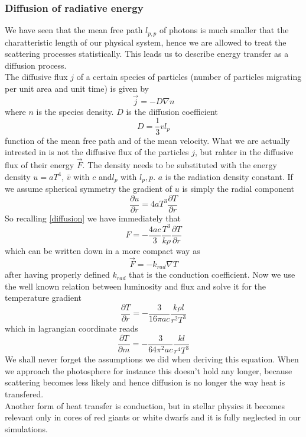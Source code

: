 \documentclass[11pt]{article}
\begin{document}
\subsubsection{Diffusion of radiative energy}
We have seen that the mean free path $l_{p,p}$ of photons is much smaller that the charatteristic length of our physical system, hence we are allowed to treat the scattering processes statistically. This leads us to describe energy transfer as a diffusion process. \\
The diffusive flux $j$ of a certain species of particles (number of particles migrating per unit area and unit time) is given by
\begin{equation}\label{diffusion}
	\vec  j=-D \nabla n
\end{equation}
where $n$ is the species density. $D$ is the diffusion coefficient
\begin{equation}
	D =\frac{1}{3} v l_{p}
\end{equation}
function of the mean free path and of the mean velocity. What we are actually intrested in is not the diffusive flux of the particles $j$, but rahter in the diffusive flux of their energy $\vec F$. The density needs to be substituted with the energy density $u=aT^4$, $\bar v$ with $c$ and$l_p$ with $l_p,p$. $a$ is the radiation density constant. If we assume spherical symmetry the gradient of $u$ is simply the radial component
\begin{equation}
	\frac{\partial u}{\partial r} = 4  a  T^3   \frac{\partial T}{\partial r}
\end{equation}
So recalling \ref{diffusion} we have immediately that
\begin{equation}
	F=-\frac{4ac}{3}\frac{T^3}{k \rho} \frac{\partial T}{\partial r}
\end{equation}
which can be written down in a more compact way as 
\begin{equation}
	\vec F = - k_{rad} \nabla T
\end{equation}
after having properly defined $k_{rad}$ that is the conduction coefficient. Now we use the well known relation between luminosity and flux and solve it for the temperature gradient
\begin{equation}
	\frac{\partial T}{\partial r}= - \frac{3}{16 \pi a c}\frac{k \rho l}{r^2 T^3}
\end{equation}
which in lagrangian coordinate reads
\begin{equation}\label{partialTpartialm}
	\frac{\partial T}{\partial m}= - \frac{3}{64 \pi^2 a c}\frac{k l}{r^4 T^3}
\end{equation}
We shall never forget the assumptions we did when deriving this equation. When we approach the photosphere for instance this doesn't hold any longer, because scattering becomes less likely and hence diffusion is no longer the way heat is transfered. \\
Another form of heat transfer is conduction, but in stellar physics it becomes relevant only in cores of red giants or white dwarfs and it is fully neglected in our simulations.
\end{document}
